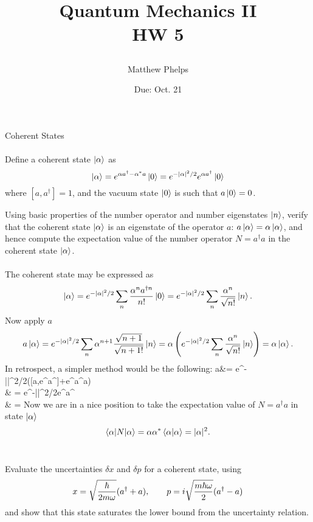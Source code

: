\documentclass[10pt,letterpaper]{article}
\title{\begin{spacing}{1.2}Quantum Mechanics II\\HW 5\end{spacing}}
\author{Matthew Phelps}
\date{Due: Oct. 21}
\begin{document}
\maketitle

\benum
  	\item{Coherent States}
	\\
	\\
	Define a coherent state $\ket \alpha$ as
	\[
		\ket \alpha = e^{\alpha a^\dag-\alpha^*a}\ket 0 = e^{-|\alpha|^2/2}e^{\alpha a^\dag}\ket 0
	\]
	where $[a,a^\dag] = 1$, and the vacuum state $\ket 0$ is such that $a\ket 0 = 0$. 
	
	\benum
	\item
	Using basic properties of the number operator and number eigenstates $\ket n$, verify that the coherent state
	$\ket \alpha$ is an eigenstate of the operator $a$: $a\ket\alpha = \alpha\ket\alpha$, and hence compute the
	expectation value of the number operator $N = a^\dag a$ in the coherent state $\ket\alpha$.
	\\
	\\
	The coherent state may be expressed as
	\[
		\ket\alpha = e^{-|\alpha|^2/2} \sum_n \frac{\alpha^n a^{\dag n}}{n!} \ket 0 
		=  e^{-|\alpha|^2/2} \sum_n \frac{\alpha^n}{\sqrt{n!}}\ket n.
	\]
	Now apply $a$
	\[
		a\ket\alpha =   e^{-|\alpha|^2/2}   \sum_n \alpha^{n+1}\frac{\sqrt{n+1}}{\sqrt{n+1!}}\ket n 
		= \alpha \left(e^{-|\alpha|^2/2} \sum_n \frac{\alpha^n}{\sqrt{n!}}\ket n\right) = \alpha\ket\alpha.
	\]
	In retrospect, a simpler method would be the following:
	\ba
		a\ket\alpha &= e^{-|\alpha|^2/2}([a,e^{\alpha a^\dag}]+e^{\alpha a^\dag}a) \\
		& = e^{-|\alpha|^2/2}\alpha e^{\alpha a^\dag}\\
		& = \alpha \ket \alpha
	\ea
	Now we are in a nice position to take the expectation value of $N = a^\dag a$ in state $\ket\alpha$
	\[
		\braket{\alpha|N|\alpha} = \alpha\alpha^*\braket{\alpha|\alpha} = |\alpha|^2.
	\]
	\\
	\item
	Evaluate the uncertainties $\delta x$ and $\delta p$ for a coherent state, using 
	\[
		x = \sqrt\frac{\hbar}{2m\omega}(a^\dag +a),\qquad p = i\sqrt\frac{m\hbar\omega}{2}(a^\dag-a)
	\]
	and show that this state saturates the lower bound from the uncertainty relation. 
	\\
	\\
\end{document}

